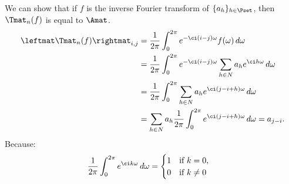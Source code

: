 We can show that if $f$ is the inverse Fourier transform of $\{a_h\}_{h \in \Pset}$, then $\Tmat_n(f)$ is equal to $\Amat$.
\begingroup
\allowdisplaybreaks
  \begin{align}
      \leftmat \Tmat_n(f) \rightmat_{i, j} &= \frac{1}{2\pi} \int_0^{2\pi} e^{-\ci (i-j)\omega} f(\omega) \,d\omega  \\
      &= \frac{1}{2\pi} \int_0^{2\pi} e^{-\ci (i-j) \omega} \sum_{h \in N} a_h e^{\ci h \omega} \,d\omega  \\
      &= \frac{1}{2\pi} \int_0^{2\pi} \sum_{h \in N} a_h e^{\ci (j - i + h) \omega} \,d\omega  \\
      &= \sum_{h \in N} a_h \frac{1}{2\pi} \int_0^{2\pi} e^{\ci (j - i + h) \omega} \,d\omega 
      = a_{j-i} .
  \end{align}
\endgroup
Because:
\begin{equation}
  \frac{1}{2\pi} \int_0^{2\pi} e^{\ci k \omega} \,d\omega = 
  \begin{cases}
    1 \quad \text{if}\ k = 0, \\
    0 \quad \text{if}\ k \neq 0
  \end{cases}
\end{equation}


